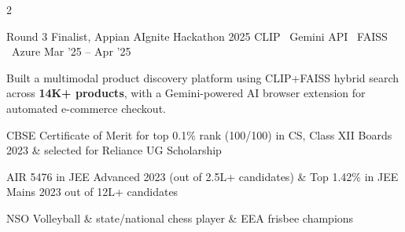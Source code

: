 \documentclass{resume}
\begin{document}
\begin{paracol}{2}
\resumeDivider

\resumeProject
{Round 3 Finalist, Appian AIgnite Hackathon 2025}
{CLIP \textbar\ Gemini API \textbar\ FAISS \textbar\ Azure}
{Mar '25 -- Apr '25}
{
\begin{resumeItemize}
\item Built a multimodal product discovery platform using CLIP+FAISS hybrid search across \textbf{14K+ products}, with a Gemini-powered AI browser extension for automated e-commerce checkout.
\end{resumeItemize}
}
{\href{https://github.com/NikhilSwaroop-P/ByteStorm-Appian/tree/hemanth}{\faGithub}}


\begin{resumeItemize}
\item CBSE Certificate of Merit for top 0.1\% rank (100/100) in CS, Class XII Boards 2023 \& selected for Reliance UG Scholarship 
\item AIR 5476 in JEE Advanced 2023 (out of 2.5L+ candidates) \& Top 1.42\% in JEE Mains 2023 out of 12L+ candidates
\end{resumeItemize}


\begin{resumeItemize}
\item NSO Volleyball \& state/national chess player \& EEA frisbee champions
\end{resumeItemize}

\end{paracol}
\end{document}
